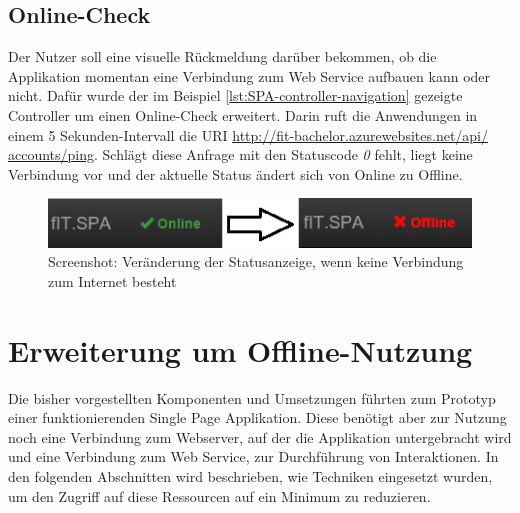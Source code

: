{\subsection{Online-Check}
\label{ssec:Online-Check}
Der Nutzer soll eine visuelle Rückmeldung darüber bekommen, ob die Applikation momentan eine Verbindung zum Web Service aufbauen kann oder nicht. Dafür wurde der im Beispiel \ref{lst:SPA-controller-navigation} gezeigte Controller um einen Online-Check erweitert. Darin ruft die Anwendungen in einem 5 Sekunden-Intervall die \ac{URI} \href{http://fit-bachelor.azurewebsites.net/api/accounts/ping}{http://fit-bachelor.azurewebsites.net/api/ accounts/ping}. Schlägt diese Anfrage mit den Statuscode \textit{0} fehlt, liegt keine Verbindung vor und der aktuelle Status ändert sich von Online zu Offline.
\begin{figure}[h]
\centering
\includegraphics[width=0.8\linewidth]{content/images/SPA-Online-Check}
\caption{Screenshot: Veränderung der Statusanzeige, wenn keine Verbindung zum Internet besteht}
\label{pic:SPA:OnlineCheck:Statusänderung}
\end{figure}

\section{Erweiterung um Offline-Nutzung}
\label{sec:CachedHttpService}
Die bisher vorgestellten Komponenten und Umsetzungen führten zum Prototyp einer funktionierenden Single Page Applikation. Diese benötigt aber zur Nutzung noch eine Verbindung zum Webserver, auf der die Applikation untergebracht wird und eine Verbindung zum Web Service, zur Durchführung von Interaktionen. In den folgenden Abschnitten wird beschrieben, wie Techniken eingesetzt wurden, um den Zugriff auf diese Ressourcen auf ein Minimum zu reduzieren. 
}
